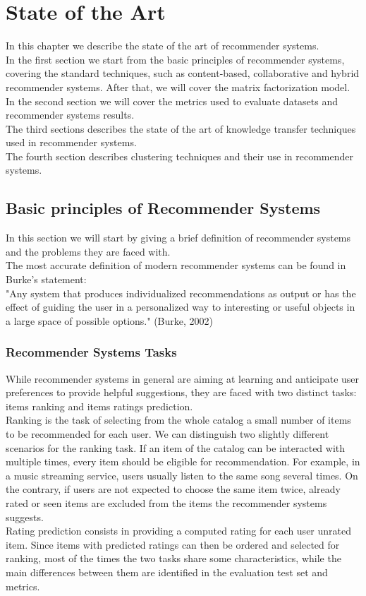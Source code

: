 \chapter{State of the Art}

In this chapter we describe the state of the art of recommender systems.\\
In the first section we start from the basic principles of recommender systems, covering the standard techniques, such as content-based, collaborative and hybrid recommender systems. After that, we will cover the matrix factorization model.\\
In the second section we will cover the metrics used to evaluate datasets and recommender systems results.\\
The third sections describes the state of the art of knowledge transfer techniques used in recommender systems.\\
The fourth section describes clustering techniques and their use in recommender systems.



\section{Basic principles of Recommender Systems}

In this section we will start by giving a brief definition of recommender systems and the problems they are faced with.\\
The most accurate definition of modern recommender systems can be found in Burke's statement:\\
"Any system that produces individualized recommendations as output or has the effect of guiding the user in a personalized way to interesting or useful objects in a large space of possible options." (Burke, 2002)


\subsection{Recommender Systems Tasks}

While recommender systems in general are aiming at learning and anticipate user preferences to provide helpful suggestions, they are faced with two distinct tasks: items ranking and items ratings prediction.\\
Ranking is the task of selecting from the whole catalog a small number of items to be recommended for each user. We can distinguish two slightly different scenarios for the ranking task. If an item of the catalog can be interacted with multiple times, every item should be eligible for recommendation. For example, in a music streaming service, users usually listen to the same song several times. On the contrary, if users are not expected to choose the same item twice, already rated or seen items are excluded from the items the recommender systems suggests.\\
Rating prediction consists in providing a computed rating for each user unrated item. Since items with predicted ratings can then be ordered and selected for ranking, most of the times the two tasks share some characteristics, while the main differences between them are identified in the evaluation test set and metrics.


